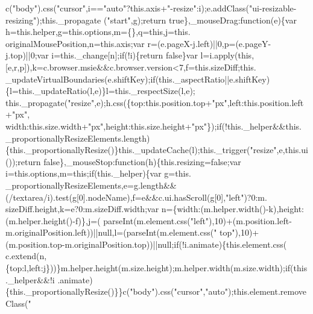 \begin{DoxyCode}
      c(\textcolor{stringliteral}{"body"}).css(\textcolor{stringliteral}{"cursor"},i==\textcolor{stringliteral}{"auto"}?this.axis+\textcolor{stringliteral}{"-resize"}:i);e.addClass(\textcolor{stringliteral}{"ui-resizable-resizing"});this.\_propagate
      (\textcolor{stringliteral}{"start"},g);\textcolor{keywordflow}{return} \textcolor{keyword}{true}\},\_mouseDrag:\textcolor{keyword}{function}(e)\{var h=this.helper,g=this.options,m=\{\},q=\textcolor{keyword}{this},j=this.
      originalMousePosition,n=this.axis;var r=(e.pageX-j.left)||0,p=(e.pageY-j.top)||0;var i=this.\_change[n];\textcolor{keywordflow}{if}(!i)\{\textcolor{keywordflow}{return}
       \textcolor{keyword}{false}\}var l=i.apply(\textcolor{keyword}{this},[e,r,p]),k=c.browser.msie&&c.browser.version<7,f=this.sizeDiff;this.
      \_updateVirtualBoundaries(e.shiftKey);\textcolor{keywordflow}{if}(this.\_aspectRatio||e.shiftKey)\{l=this.\_updateRatio(l,e)\}l=this.\_respectSize(l,e);
      this.\_propagate(\textcolor{stringliteral}{"resize"},e);h.css(\{top:this.position.top+\textcolor{stringliteral}{"px"},left:this.position.left+\textcolor{stringliteral}{"px"},
      width:this.size.width+\textcolor{stringliteral}{"px"},height:this.size.height+\textcolor{stringliteral}{"px"}\});\textcolor{keywordflow}{if}(!this.\_helper&&this.
      \_proportionallyResizeElements.length)\{this.\_proportionallyResize()\}this.\_updateCache(l);this.\_trigger(\textcolor{stringliteral}{"resize"},e,this.ui());\textcolor{keywordflow}{return} \textcolor{keyword}{
      false}\},\_mouseStop:\textcolor{keyword}{function}(h)\{this.resizing=\textcolor{keyword}{false};var i=this.options,m=\textcolor{keyword}{this};\textcolor{keywordflow}{if}(this.\_helper)\{var g=this.
      \_proportionallyResizeElements,e=g.length&&(/textarea/i).test(g[0].nodeName),f=e&&c.ui.hasScroll(g[0],\textcolor{stringliteral}{"left"})?0:m.
      sizeDiff.height,k=e?0:m.sizeDiff.width;var n=\{width:(m.helper.width()-k),height:(m.helper.height()-f)\},j=(
      parseInt(m.element.css(\textcolor{stringliteral}{"left"}),10)+(m.position.left-m.originalPosition.left))||null,l=(parseInt(m.element.css(\textcolor{stringliteral}{"
      top"}),10)+(m.position.top-m.originalPosition.top))||null;\textcolor{keywordflow}{if}(!i.animate)\{this.element.css(
      c.extend(n,\{top:l,left:j\}))\}m.helper.height(m.size.height);m.helper.width(m.size.width);\textcolor{keywordflow}{if}(this.\_helper&&!i
      .animate)\{this.\_proportionallyResize()\}\}c(\textcolor{stringliteral}{"body"}).css(\textcolor{stringliteral}{"cursor"},\textcolor{stringliteral}{"auto"});this.element.removeClass(\textcolor{stringliteral}{"
}
\end{DoxyCode}
